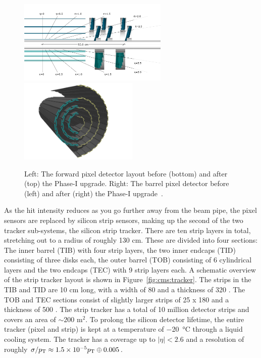 \begin{figure}[h] 
    \centering  
    \includegraphics[height=4cm,keepaspectratio]{figures/cms/20120828_01_pixel_phase1_largesharp.png}
    \includegraphics[height=4cm,keepaspectratio]{figures/cms/20120827_01_pixel_phase1_04.png}
    \caption{Left: The forward pixel detector layout before (bottom) and after (top) the Phase-I upgrade. Right: The barrel pixel detector before (left) and after (right) the Phase-I upgrade~\cite{Dominguez:1481838}.}
    \label{fig:cms:pixel}
\end{figure}

As the hit intensity reduces as you go further away from the beam pipe, the pixel sensors are replaced by silicon strip sensors, making up the second of the two tracker sub-systems, the silicon strip tracker. There are ten strip layers in total, stretching out to a radius of roughly 130 cm. These are divided into four sections: The inner barrel (TIB) with four strip layers, the two inner endcaps (TID) consisting of three disks each, the outer barrel (TOB) consisting of 6 cylindrical layers and the two endcaps (TEC) with 9 strip layers each. A schematic overview of the strip tracker layout is shown in Figure~\ref{fig:cms:tracker}.
The strips in the TIB and TID are 10 cm long, with a width of 80 \micron and a thickness of 320 \micron. The TOB and TEC sections consist of slightly larger strips of 25 \cm x 180 \micron and a thickness of 500 \micron. The strip tracker has a total of 10 million detector strips and covers an area of $\sim 200 \textrm{ m}^2$.
To prolong the silicon detector lifetime, the entire tracker (pixel and strip) is kept at a temperature of \SI{-20}{\celsius} through a liquid cooling system.
The tracker has a coverage up to $|\eta|<2.6$ and a resolution of roughly $\sigma / p_{\mathrm{T}} \approx 1.5 \times 10^{-5} p_{\mathrm{T}} \oplus 0.005$.

